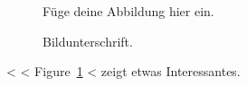\<%

\begin{figure}
  \centering
  Füge deine Abbildung hier ein.
  \caption{Bildunterschrift.}
  \label{fig:label}
\end{figure}

<%
 <%
Figure~\ref{fig:label}
<%
zeigt etwas Interessantes.
